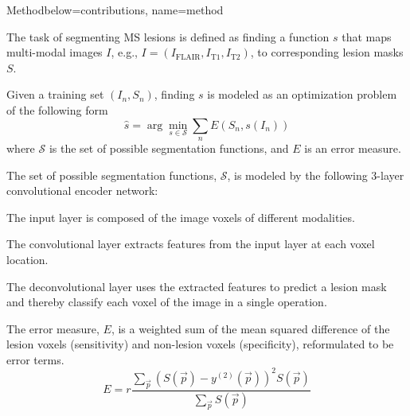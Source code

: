 \documentclass[%
portrait,paperwidth=841mm,paperheight=1180mm,%
margin=2cm,
fontscale=0.32
]{baposter}
\newcommand{\vect}[1]{\vec{#1}}
\begin{document}
\begin{poster}
\begin{headerblock}{Method}{below=contributions, name=method}
\begin{compactitem}
\item The task of segmenting MS lesions is defined as finding a function $s$
that maps multi-modal images $I$, e.g., $I = (I_\text{FLAIR}, I_\text{T1},
I_\text{T2})$, to corresponding lesion masks $S$.
\item Given a training set $(I_n,S_n)$, finding $s$ is modeled as an
optimization problem of the following form
\begin{equation}
\hat{s} = \arg \min_{s \in \mathcal{S}} \sum_n E(S_n, s(I_n))
\label{eq:segprob}
\end{equation}
where $\mathcal{S}$ is the set of possible segmentation functions, and $E$ is an
error measure.
\item The set of possible segmentation functions, $\mathcal{S}$, is modeled by
the following 3-layer convolutional encoder network:
\end{compactitem}
\begin{center}

\end{center}
% 
\begin{compactitem}
\item The input layer is composed of the image voxels of different
modalities.
\item The convolutional layer extracts features from the input layer at
each voxel location.
\item The deconvolutional layer uses the extracted features to predict a lesion
mask and thereby classify each voxel of the image in a single operation.
\item The error measure, $E$, is a weighted sum of the mean squared
difference of the lesion voxels (sensitivity) and non-lesion voxels
(specificity), reformulated to be error terms.
\begin{equation}
E = r\frac{\textstyle\sum_{\vect{p}} \left(S(\vect{p}) -
y^{(2)}(\vect{p})\right)^2 S(\vect{p})}{\textstyle\sum_{\vect{p}} S(\vect{p})}

\end{equation}
\end{compactitem}
\end{headerblock}
\end{poster}
\end{document}

